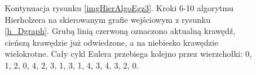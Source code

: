 \documentclass[a4paper, 12pt, twoside, openright]{article}
\begin{document}
\begin{figure}[p]
   	\quad
   	
   	\caption[]{Kontynuacja rysunku \ref{imgHierAlgoEgz3}. Kroki 6-10 algorytmu Hierholzera na skierowanym grafie wejściowym z rysunku \ref{h_Dgraph}. Grubą linią czerwoną oznaczono aktualną krawędź, cieńszą krawędzie już odwiedzone, a na niebiesko krawędzie wielokrotne. Cały cykl Eulera przebiega kolejno przez wierzchołki: 0, 1, 2, 0, 4, 2, 3, 1, 3, 1, 4, 3, 4, 3, 2, 0.}
   	\label{imgHierAlgoEgz4}
   \end{figure}	
\end{document}
